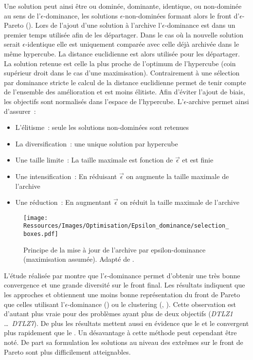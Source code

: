Une solution peut ainsi être ou dominée, dominante, identique, ou non-dominée au sens de
l’$\epsilon$-dominance, les solutions $\epsilon$-non-dominées formant alors le front
d’$\epsilon$-Pareto (). Lors de l’ajout d’une solution à
l’archive l’$\epsilon$-dominance est dans un premier temps utilisée afin de les
départager. Dans le cas où la nouvelle solution serait $\epsilon$-identique elle est
uniquement comparée avec celle déjà archivée dans le même hypercube. La distance
euclidienne est alors utilisée pour les départager. La solution retenue est celle la plus
proche de l’optimum de l’hypercube (coin supérieur droit dans le cas d’une maximisation).
Contrairement à une sélection par dominance stricte le calcul de la distance euclidienne
permet de tenir compte de l’ensemble des amélioration et est moins élitiste. Afin d’éviter
l’ajout de biais, les objectifs sont normalisés dans l’espace de l’hypercube.
L’$\epsilon$-archive permet ainsi d’assurer~:
\begin{itemize}
  \item L’élitisme~: seule les solutions non-dominées sont retenues
  \item La diversification~: une unique solution par hypercube
  \item Une taille limite~: La taille maximale est fonction de $\vec{\epsilon}$ et est finie
  \item Une intensification~: En réduisant $\vec{\epsilon}$ on augmente la taille maximale de l’archive
  \item Une réduction~: En augmentant $\vec{\epsilon}$ on réduit la taille maximale de l’archive
\end{itemize}

\begin{figure}
    \centering
    \texttt{[image: Ressources/Images/Optimisation/Epsilon\_dominance/selection\_boxes.pdf]}
    \caption[Principe de la mise à jour de l’archive par epsilon-dominance]
            {Principe de la mise à jour de l’archive par epsilon-dominance (maximisation assumée).
             Adapté de \cite{Deb2005501}.}
    \label{fig:epsilon_dominance}
\end{figure}
L’étude réalisée par \textcite{Deb2005501} montre que l’$\epsilon$-dominance permet
d’obtenir une très bonne convergence et une grande diversité sur le front final.
Les résultats indiquent que les approches  et  obtiennent une moins
bonne représentation du front de Pareto que celles utilisant l’$\epsilon$-dominance
() ou le clustering (, ).
Cette observation est d’autant plus vraie pour des problèmes ayant plus de deux
objectifs (\textit{DTLZ1} \dots\ \textit{DTLZ7}).
De plus les résultats mettent aussi en évidence que le  et le 
convergent plus rapidement que le .
Un désavantage à cette méthode peut cependant être noté. De part sa formulation
les solutions au niveau des extrêmes sur le front de Pareto sont plus difficilement
atteignables.

